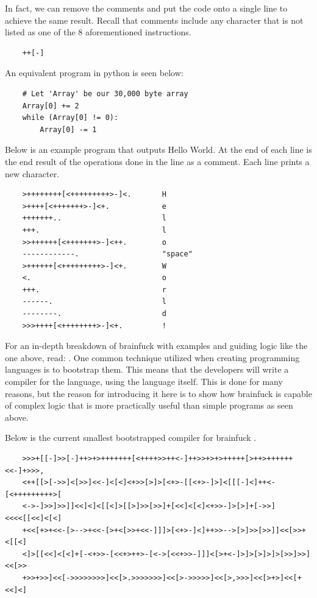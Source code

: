 In fact, we can remove the comments and put the code onto a single line to achieve the same result.
Recall that comments include any character that is not listed as one of the 8 aforementioned instructions.

\begin{verbatim}
    ++[-]
\end{verbatim}

\newpage

An equivalent program in python is seen below:

\begin{verbatim}
    # Let 'Array' be our 30,000 byte array
    Array[0] += 2
    while (Array[0] != 0):
        Array[0] -= 1
\end{verbatim}

Below is an example program that outputs Hello World.
At the end of each line is the end result of the operations done in the line as a comment.
Each line prints a new character.

\begin{verbatim}
    >++++++++[<+++++++++>-]<.       H
    >++++[<+++++++>-]<+.            e
    +++++++..                       l
    +++.                            l
    >>++++++[<+++++++>-]<++.        o
    ------------.                   "space"
    >++++++[<+++++++++>-]<+.        W
    <.                              o
    +++.                            r
    ------.                         l
    --------.                       d
    >>>++++[<++++++++>-]<+.         !
\end{verbatim}

For an in-depth breakdown of brainfuck with examples and guiding logic like the one above, read: \cite{BfGH}.
One common technique utilized when creating programming languages is to bootstrap them.
This means that the developers will write a compiler for the language, using the language itself.
This is done for many reasons, but the reason for introducing it here is to show how brainfuck is capable of complex logic that is more practically useful than simple programs as seen above.

Below is the current smallest bootstrapped compiler for brainfuck \cite{SmallestBfCompiler,SmallestBfCompilerActual}.

\begin{verbatim}
    >>>+[[-]>>[-]++>+>+++++++[<++++>>++<-]++>>+>+>+++++[>++>++++++<<-]+>>>,
    <++[[>[->>]<[>>]<<-]<[<]<+>>[>]>[<+>-[[<+>-]>]<[[[-]<]++<-[<+++++++++>[
    <->-]>>]>>]]<<]<]<[[<]>[[>]>>[>>]+[<<]<[<]<+>>-]>[>]+[->>]<<<<[[<<]<[<]
    +<<[+>+<<-[>-->+<<-[>+<[>>+<<-]]]>[<+>-]<]++>>-->[>]>>[>>]]<<[>>+<[[<]
    <]>[[<<]<[<]+[-<+>>-[<<+>++>-[<->[<<+>>-]]]<[>+<-]>]>[>]>]>[>>]>>]<<[>>
    +>>+>>]<<[->>>>>>>>]<<[>.>>>>>>>]<<[>->>>>>]<<[>,>>>]<<[>+>]<<[+<<]<]
\end{verbatim}

